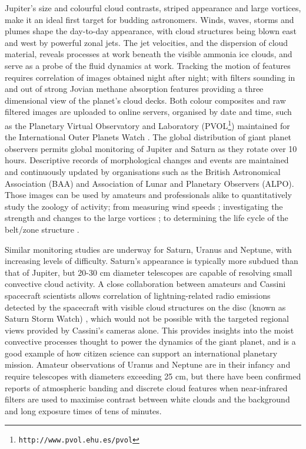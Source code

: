 \documentclass{ar2e}
\begin{document}
Jupiter's size and colourful cloud contrasts, striped appearance and large
vortices, make it an ideal first target for budding astronomers.  Winds, waves,
storms and plumes shape the day-to-day appearance, with cloud structures being
blown east and west by powerful zonal jets.  The jet velocities, and the
dispersion of cloud material, reveals processes at work beneath the visible
ammonia ice clouds, and serve as a probe of the fluid dynamics at work. 
Tracking the motion of features requires correlation of images obtained night
after night; with filters sounding in and out of strong Jovian methane
absorption features providing a three dimensional view of the planet's cloud
decks.  Both colour composites and raw filtered images are uploaded to online
servers, organised by date and time, such as the Planetary Virtual Observatory
and Laboratory (PVOL\footnote{\texttt{http://www.pvol.ehu.es/pvol}}) maintained
for the International Outer Planets Watch \citep[IOPW][]{10hueso}.  The global
distribution of giant planet observers permits global monitoring of Jupiter and
Saturn as they rotate over 10 hours.  Descriptive records of morphological
changes and events are maintained and continuously updated by organisations such
as the British Astronomical Association (BAA) and Association of Lunar and
Planetary Observers (ALPO).   Those images can be used by amateurs and
professionals alike to quantitatively study the zoology of activity; from
measuring wind speeds \citep{08sanchez}; investigating the strength and changes
to the large vortices \citep[e.g., the 2006 reddening of Oval
BA,][]{06simon-miller}; to determining the life cycle of the belt/zone structure
\citep{96sanchez, 11fletcher}. 

Similar monitoring studies are underway for Saturn, Uranus and Neptune, with
increasing levels of difficulty.  Saturn's appearance is typically more
subdued than that of Jupiter, but 20-30 cm diameter telescopes are capable of
resolving small convective cloud activity.  A close collaboration between
amateurs and Cassini spacecraft scientists allows correlation of
lightning-related radio emissions detected by the spacecraft with visible
cloud structures on the disc (known as Saturn Storm Watch)
\citep[e.g.,][]{11fischer}, which would not be possible with the targeted
regional views provided by Cassini's cameras alone.  This provides insights
into the moist convective processes thought to power the dynamics of the giant
planet, and is a good example of how citizen science can support an
international planetary mission. Amateur observations of Uranus and Neptune
are in their infancy and require telescopes with diameters exceeding 25 cm,
but there have been confirmed reports of atmospheric banding and discrete
cloud features when near-infrared filters are used to maximise contrast
between white clouds and the background and long exposure times of tens of
minutes.
\end{document}
